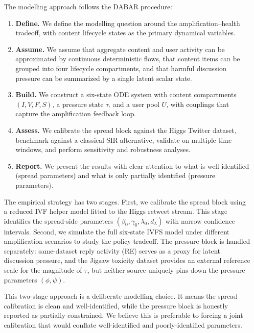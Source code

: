 \documentclass[11pt]{article}
\begin{document}
The modelling approach follows the DABAR procedure:
\begin{enumerate}[leftmargin=1.5em]
    \item \textbf{Define.} We define the modelling question around the amplification--health tradeoff, with content lifecycle states as the primary dynamical variables.
    \item \textbf{Assume.} We assume that aggregate content and user activity can be approximated by continuous deterministic flows, that content items can be grouped into four lifecycle compartments, and that harmful discussion pressure can be summarized by a single latent scalar state.
    \item \textbf{Build.} We construct a six-state ODE system with content compartments $(I,V,F,S)$, a pressure state $\tau$, and a user pool $U$, with couplings that capture the amplification feedback loop.
    \item \textbf{Assess.} We calibrate the spread block against the Higgs Twitter dataset, benchmark against a classical SIR alternative, validate on multiple time windows, and perform sensitivity and robustness analyses.
    \item \textbf{Report.} We present the results with clear attention to what is well-identified (spread parameters) and what is only partially identified (pressure parameters).
\end{enumerate}

The empirical strategy has two stages. First, we calibrate the spread block using a reduced IVF helper model fitted to the Higgs retweet stream. This stage identifies the spread-side parameters $(\beta_0, \gamma_0, \lambda_0, d_\lambda)$ with narrow confidence intervals. Second, we simulate the full six-state IVFS model under different amplification scenarios to study the policy tradeoff. The pressure block is handled separately: same-dataset reply activity (RE) serves as a proxy for latent discussion pressure, and the Jigsaw toxicity dataset provides an external reference scale for the magnitude of $\tau$, but neither source uniquely pins down the pressure parameters $(\phi, \psi)$.

This two-stage approach is a deliberate modelling choice. It means the spread calibration is clean and well-identified, while the pressure block is honestly reported as partially constrained. We believe this is preferable to forcing a joint calibration that would conflate well-identified and poorly-identified parameters.


\end{document}

